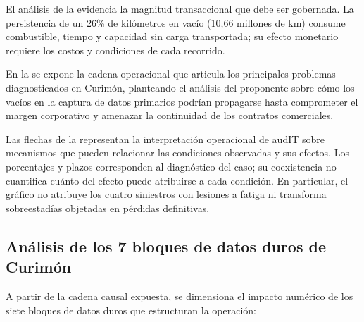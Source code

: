 El análisis de la  evidencia la magnitud transaccional que debe ser gobernada. La persistencia de un 26\% de kilómetros en vacío (10,66 millones de km) consume combustible, tiempo y capacidad sin carga transportada; su efecto monetario requiere los costos y condiciones de cada recorrido.

En la  se expone la cadena operacional que articula los principales problemas diagnosticados en Curimón, planteando el análisis del proponente sobre cómo los vacíos en la captura de datos primarios podrían propagarse hasta comprometer el margen corporativo y amenazar la continuidad de los contratos comerciales.


Las flechas de la  representan la interpretación operacional de audIT sobre mecanismos que pueden relacionar las condiciones observadas y sus efectos. Los porcentajes y plazos corresponden al diagnóstico del caso; su coexistencia no cuantifica cuánto del efecto puede atribuirse a cada condición. En particular, el gráfico no atribuye los cuatro siniestros con lesiones a fatiga ni transforma sobreestadías objetadas en pérdidas definitivas.


\subsection{Análisis de los 7 bloques de datos duros de Curimón}\label{sec:2-datos-duros}

A partir de la cadena causal expuesta, se dimensiona el impacto numérico de los siete bloques de datos duros que estructuran la operación:

